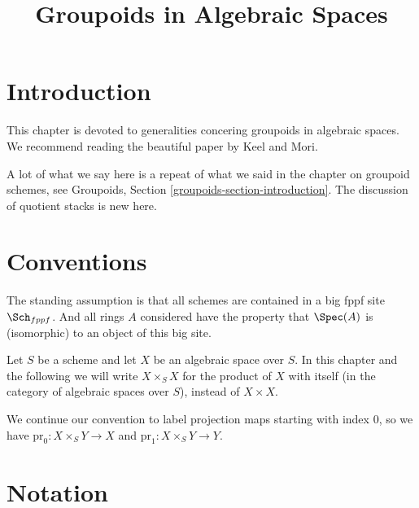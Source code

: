 

%


\title{Groupoids in Algebraic Spaces}


\maketitle

\label{section-phantom}

\tableofcontents

\section{Introduction}
\label{section-introduction}

\noindent
This chapter is devoted to generalities concering groupoids in algebraic
spaces. We recommend reading the beautiful paper \cite{K-M} by Keel and Mori.

\medskip\noindent
A lot of what we say here is a repeat of what we said in the chapter
on groupoid schemes, see
Groupoids, Section \ref{groupoids-section-introduction}.
The discussion of quotient stacks is new here.


\section{Conventions}
\label{section-conventions}

\noindent
The standing assumption is that all schemes are contained in
a big fppf site $\Sch_{fppf}$. And all rings $A$ considered
have the property that $\Spec(A)$ is (isomorphic) to an
object of this big site.

\medskip\noindent
Let $S$ be a scheme and let $X$ be an algebraic space over $S$.
In this chapter and the following we will write $X \times_S X$
for the product of $X$ with itself (in the category of algebraic
spaces over $S$), instead of $X \times X$.

\medskip\noindent
We continue our convention to label projection maps starting with
index $0$, so we have $\text{pr}_0 : X \times_S Y \to X$ and
$\text{pr}_1 : X \times_S Y \to Y$.




\section{Notation}
\label{section-notation}

